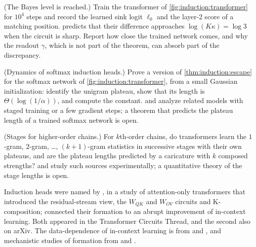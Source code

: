 \begin{refsection}
\begin{exercises}
\item \simulation (The Bayes level is reached.) Train the transformer of \cref{fig:induction:transformer} for $10^4$ steps and record the learned sink logit $\ell_0$ and the layer-2 score of a matching position.  predicts that their difference approaches $\log(K\kappa)=\log3$ when the circuit is sharp. Report how close the trained network comes, and why the readout $\gamma$, which is not part of the theorem, can absorb part of the discrepancy. \label{ex:induction:sink}

\item \research (Dynamics of softmax induction heads.) Prove a version of \cref{thm:induction:escape} for the softmax network of \cref{fig:induction:transformer}, from a small Gaussian initialization: identify the unigram plateau, show that its length is $\Theta(\log(1/\alpha))$, and compute the constant. \Textcite{NichaniEtAl2024} and \textcite{BiettiEtAl2023} analyze related models with staged training or a few gradient steps; a theorem that predicts the plateau length of a trained softmax network is open. \label{ex:induction:research}

\item \research (Stages for higher-order chains.) For $k$th-order chains, do transformers learn the $1$-gram, $2$-gram, \dots, $(k+1)$-gram statistics in successive stages with their own plateaus, and are the plateau lengths predicted by a caricature with $k$ composed strengths? \Textcite{EdelmanEtAl2024} and \textcite{AkyurekEtAl2024} study such sources experimentally; a quantitative theory of the stage lengths is open. \label{ex:induction:stages}
\end{exercises}

\notesandrefs
Induction heads were named by \textcite{ElhageEtAl2021}, in a study of attention-only transformers that introduced the residual-stream view, the $W_{QK}$ and $W_{OV}$ circuits and K-composition; \textcite{OlssonEtAl2022} connected their formation to an abrupt improvement of in-context learning. Both appeared in the Transformer Circuits Thread, and the second also on arXiv. The data-dependence of in-context learning is from \textcite{ChanEtAl2022} and \textcite{SinghEtAl2023}, and mechanistic studies of formation from \textcite{Reddy2024} and \textcite{SinghEtAl2024}.


\end{refsection}
